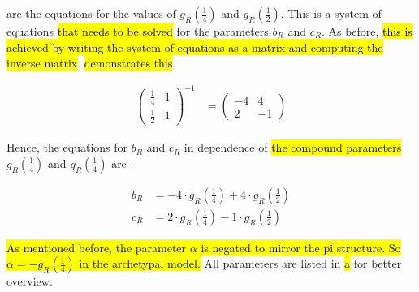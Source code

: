  are the equations for the values of $g_R\left(\frac{1}{4}\right)$ and $g_R\left(\frac{1}{2}\right)$.
This is a system of equations \hl{that needs to be solved} for the parameters $b_R$ and $c_R$.
As before, \hl{this is achieved by writing the system of equations as a matrix and computing the inverse matrix}.
 \hl{demonstrates this}.

\begin{align}
	\begin{pmatrix}
		\frac{1}{4} & 1 \\
		\frac{1}{2} & 1
	\end{pmatrix}^{-1} & =
	\begin{pmatrix}
		-4 & 4  \\
		2  & -1
	\end{pmatrix}
	\label{equ:setup.arch.matrix}
\end{align}

Hence, the equations for $b_R$ and $c_R$ in dependence of \hl{the compound parameters} $g_R\left(\frac{1}{4}\right)$ and $g_R\left(\frac{1}{4}\right)$ are .

\begin{align}
	b_R & = -4 \cdot g_R\left(\frac{1}{4}\right) + 4 \cdot g_R\left(\frac{1}{2}\right) \label{equ:setup.arch.bR} \\
	c_R & = 2 \cdot g_R\left(\frac{1}{4}\right) - 1 \cdot g_R\left(\frac{1}{2}\right) \label{equ:setup.arch.cR}
\end{align}



\hl{
	As mentioned before, the parameter $\alpha$ is negated to mirror the \gls{pi} structure.
	So $\alpha = -g_R\left(\frac{1}{4}\right)$ in the archetypal model.
}
All parameters are listed in  \hl{a} for better overview.

